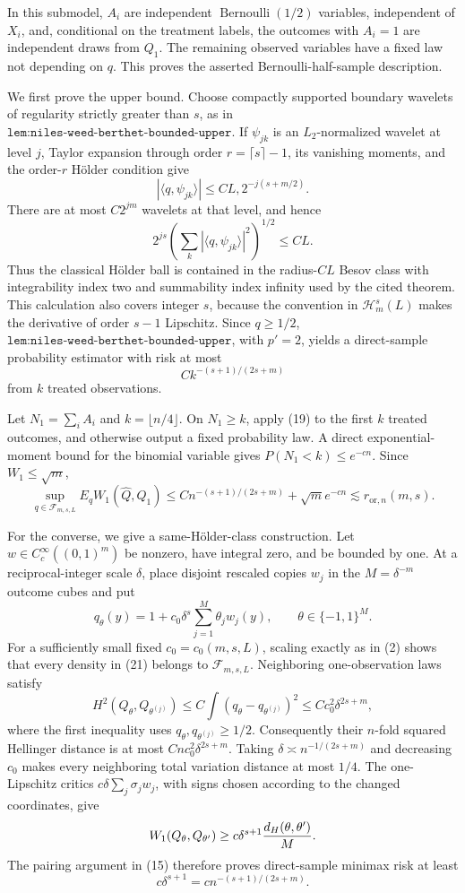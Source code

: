 In this submodel, \(A_i\) are independent \(\operatorname{Bernoulli}(1/2)\) variables, independent of \(X_i\), and, conditional on the treatment labels, the outcomes with \(A_i=1\) are independent draws from \(Q_1\).  The remaining observed variables have a fixed law not depending on \(q\).  This proves the asserted Bernoulli-half-sample description.

We first prove the upper bound.  Choose compactly supported boundary wavelets of regularity strictly greater than \(s\), as in \(\texttt{lem:niles-weed-berthet-bounded-upper}\).  If \(\psi_{jk}\) is an \(L_2\)-normalized wavelet at level \(j\), Taylor expansion through order \(r=\lceil s\rceil-1\), its vanishing moments, and the order-\(r\) Hölder condition give
\[
 |\langle q,\psi_{jk}\rangle|
 \leq C L,2^{-j(s+m/2)}.
\]
There are at most \(C2^{jm}\) wavelets at that level, and hence
\[
 2^{js}\left(\sum_k|\langle q,\psi_{jk}\rangle|^2\right)^{1/2}
 \leq CL.
 \tag{18}
\]
Thus the classical Hölder ball is contained in the radius-\(CL\) Besov class with integrability index two and summability index infinity used by the cited theorem.  This calculation also covers integer \(s\), because the convention in \(\mathcal H_m^s(L)\) makes the derivative of order \(s-1\) Lipschitz.  Since \(q\geq1/2\), \(\texttt{lem:niles-weed-berthet-bounded-upper}\), with \(p'=2\), yields a direct-sample probability estimator with risk at most
\[
 Ck^{-(s+1)/(2s+m)}
 \tag{19}
\]
from \(k\) treated observations.

Let \(N_1=\sum_iA_i\) and \(k=\lfloor n/4\rfloor\).  On \(N_1\geq k\), apply (19) to the first \(k\) treated outcomes, and otherwise output a fixed probability law.  A direct exponential-moment bound for the binomial variable gives \(P(N_1<k)\leq e^{-cn}\).  Since \(W_1\leq\sqrt m\),
\[
 \sup_{q\in\mathcal F_{m,s,L}}E_qW_1(\widehat Q,Q_1)
 \leq Cn^{-(s+1)/(2s+m)}+\sqrt m e^{-cn}
 \lesssim r_{\mathrm{or},n}(m,s).
 \tag{20}
\]

For the converse, we give a same-Hölder-class construction.  Let \(w\in C_c^\infty((0,1)^m)\) be nonzero, have integral zero, and be bounded by one.  At a reciprocal-integer scale \(\delta\), place disjoint rescaled copies \(w_j\) in the \(M=\delta^{-m}\) outcome cubes and put
\[
 q_\theta(y)=1+c_0\delta^s\sum_{j=1}^M\theta_jw_j(y),
 \qquad \theta\in\{-1,1\}^M.
 \tag{21}
\]
For a sufficiently small fixed \(c_0=c_0(m,s,L)\), scaling exactly as in (2) shows that every density in (21) belongs to \(\mathcal F_{m,s,L}\).  Neighboring one-observation laws satisfy
\[
 H^2(Q_\theta,Q_{\theta^{(j)}})
 \leq C\int(q_\theta-q_{\theta^{(j)}})^2
 \leq Cc_0^2\delta^{2s+m},
\]
where the first inequality uses \(q_\theta,q_{\theta^{(j)}}\geq1/2\).  Consequently their \(n\)-fold squared Hellinger distance is at most \(Cnc_0^2\delta^{2s+m}\).  Taking \(\delta\asymp n^{-1/(2s+m)}\) and decreasing \(c_0\) makes every neighboring total variation distance at most \(1/4\).  The one-Lipschitz critics \(c\delta\sum_j\sigma_jw_j\), with signs chosen according to the changed coordinates, give
\[
 W_1(Q_\theta,Q_{\theta'})
 \geq c\delta^{s+1}{d_H(\theta,\theta')\over M}.
\]
The pairing argument in (15) therefore proves direct-sample minimax risk at least
\[
 c\delta^{s+1}=c n^{-(s+1)/(2s+m)}.
 \tag{22}
\]

